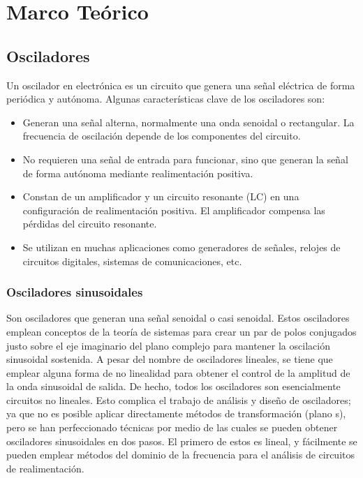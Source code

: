 \section{Marco Teórico}

    \subsection{Osciladores}

        Un oscilador en electrónica es un circuito que genera una señal eléctrica de forma periódica y autónoma. Algunas características clave de los osciladores son:

        \begin{itemize}
            \item Generan una señal alterna, normalmente una onda senoidal o rectangular. La frecuencia de oscilación depende de los componentes del circuito.
            \item No requieren una señal de entrada para funcionar, sino que generan la señal de forma autónoma mediante realimentación positiva.
            \item Constan de un amplificador y un circuito resonante (LC) en una configuración de realimentación positiva. El amplificador compensa las pérdidas del circuito resonante.
            \item Se utilizan en muchas aplicaciones como generadores de señales, relojes de circuitos digitales, sistemas de comunicaciones, etc.
        \end{itemize}

        \subsubsection{Osciladores sinusoidales}

            Son osciladores que generan una señal senoidal o casi senoidal. Estos osciladores emplean conceptos de la teoría de sistemas para crear un par de polos conjugados justo sobre el eje imaginario del plano complejo para mantener la oscilación sinusoidal sostenida. A pesar del nombre de osciladores lineales, se tiene que emplear alguna forma de no linealidad para obtener el control de la amplitud de la onda sinusoidal de salida. De hecho, todos los osciladores son esencialmente circuitos no lineales. Esto complica el trabajo de análisis y diseño de osciladores; ya que no es posible aplicar directamente métodos de transformación (plano s), pero se han perfeccionado técnicas por medio de las cuales se pueden obtener osciladores sinusoidales en dos pasos. El primero de estos es lineal, y fácilmente se pueden emplear métodos del dominio de la frecuencia para el análisis de circuitos de realimentación.

